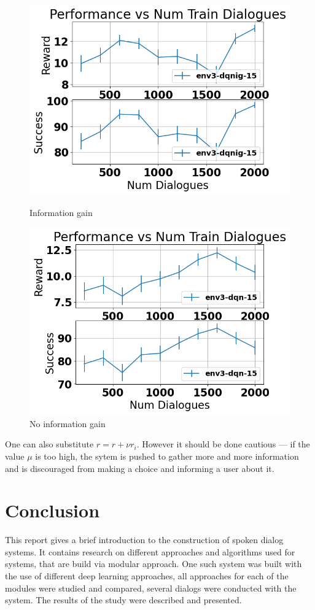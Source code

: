 \documentclass[12pt,titlepage,a4paper]{article}
\begin{document}
\begin{figure}[!htb]
      \includegraphics[width=\linewidth]{env3-ig-CamRestaurants.png}
      \caption{Information gain}
    \endminipage\hfill
      \includegraphics[width=\linewidth]{env3-CamRestaurants.png}
      \caption{No information gain}
    \endminipage
\end{figure}

One can also substitute $r = r + \nu r_i$. However it should be done cautious --- if the value $\mu$ is too high, the sytem is pushed to gather more and more information and is discouraged from making a choice and informing a user about it. 

\pagebreak

\section{Conclusion}
This report gives a brief introduction to the construction of spoken dialog systems. It contains research on different approaches and algorithms used for systems, that are build via modular approach. One such system was built with the use of different deep learning approaches, all approaches for each of the modules were studied and compared, several dialogs were conducted with the system. The results of the study were described and presented.

\pagebreak

 

\end{document}
